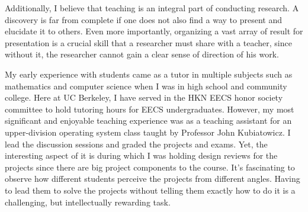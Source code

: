 \documentclass[11pt]{article}
\begin{document}

Additionally, I believe that teaching is an integral part of conducting research. A discovery is far from complete if one does not also find a way to present and elucidate it to others. Even more importantly, organizing a vast array of result for presentation is a crucial skill that a researcher must share with a teacher, since without it, the researcher cannot gain a clear sense of direction of his work. \newline

My early experience with students came as a tutor in multiple subjects such as mathematics and computer science when I was in high school and community college. Here at UC Berkeley, I have served in the HKN EECS honor society committee to hold tutoring hours for EECS undergraduates. However, my most significant and enjoyable teaching experience was as a teaching assistant for an upper-division operating system class taught by Professor John Kubiatowicz. I lead the discussion sessions and graded the projects and exams. Yet, the interesting aspect of it is during which I was holding design reviews for the projects since there are big project components to the course. It's fascinating to observe how different students perceive the projects from different angles. Having to lead them to solve the projects without telling them exactly how to do it is a challenging, but intellectually rewarding task. \newline
\end{document}
